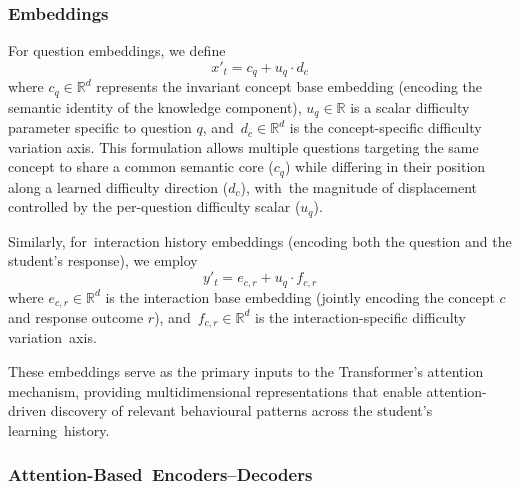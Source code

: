\documentclass[applsci,article,accept,moreauthors,pdftex]{Definitions/mdpi}
\begin{document}
\subsubsection{Embeddings} \label{sec_embeddings}

For question embeddings, we define
\begin{equation} \label{eq:task_embedding}
    x'_t = c_q + u_q \cdot d_c
\end{equation}
where $c_q \in \mathbb{R}^{d}$ represents the invariant concept base embedding (encoding the semantic identity of the knowledge component), $u_q \in \mathbb{R}$ is a scalar difficulty parameter specific to question $q$, and~$d_c \in \mathbb{R}^{d}$ is the concept-specific difficulty variation axis. This formulation allows multiple questions targeting the same concept to share a common semantic core ($c_q$) while differing in their position along a learned difficulty direction ($d_c$), with~the magnitude of displacement controlled by the per-question difficulty scalar ($u_q$).

Similarly, for~interaction history embeddings (encoding both the question and the student's response), we employ
\begin{equation} \label{eq:interaction_embedding}
    y'_t = e_{c,r} + u_q \cdot f_{c,r}
\end{equation}
where $e_{c,r} \in \mathbb{R}^{d}$ is the interaction base embedding (jointly encoding the concept $c$ and response outcome $r$), and~$f_{c,r} \in \mathbb{R}^{d}$ is the interaction-specific difficulty variation~axis. 


These embeddings serve as the primary inputs to the Transformer's attention mechanism, providing multidimensional representations that enable attention-driven discovery of relevant {behavioural} patterns across the student's learning~history.

\subsubsection{Attention-Based~Encoders--Decoders} \label{sec_enc_dec}
\end{document}
